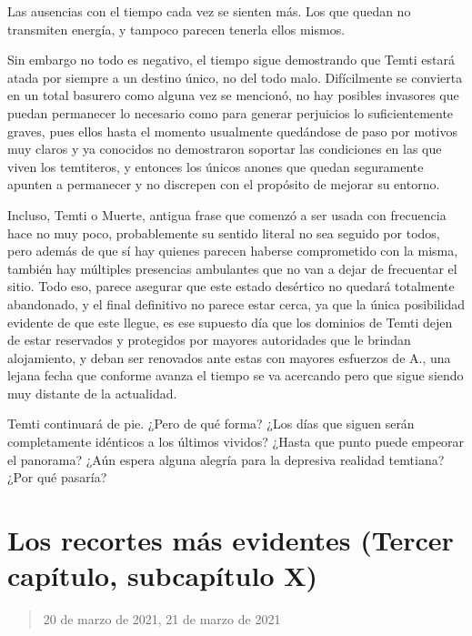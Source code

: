 \documentclass[
  spanish,
]{book}
\begin{document}
Las ausencias con el tiempo cada vez se sienten más. Los que quedan no transmiten energía, y tampoco parecen tenerla ellos mismos.

Sin embargo no todo es negativo, el tiempo sigue demostrando que Temti estará atada por siempre a un destino único, no del todo malo. Difícilmente se convierta en un total basurero como alguna vez se mencionó, no hay posibles invasores que puedan permanecer lo necesario como para generar perjuicios lo suficientemente graves, pues ellos hasta el momento usualmente quedándose de paso por motivos muy claros y ya conocidos no demostraron soportar las condiciones en las que viven los temtiteros, y entonces los únicos anones que quedan seguramente apunten a permanecer y no discrepen con el propósito de mejorar su entorno.

Incluso, Temti o Muerte, antigua frase que comenzó a ser usada con frecuencia hace no muy poco, probablemente su sentido literal no sea seguido por todos, pero además de que sí hay quienes parecen haberse comprometido con la misma, también hay múltiples presencias ambulantes que no van a dejar de frecuentar el sitio. Todo eso, parece asegurar que este estado desértico no quedará totalmente abandonado, y el final definitivo no parece estar cerca, ya que la única posibilidad evidente de que este llegue, es ese supuesto día que los dominios de Temti dejen de estar reservados y protegidos por mayores autoridades que le brindan alojamiento, y deban ser renovados ante estas con mayores esfuerzos de A., una lejana fecha que conforme avanza el tiempo se va acercando pero que sigue siendo muy distante de la actualidad.

Temti continuará de pie. ¿Pero de qué forma? ¿Los días que siguen serán completamente idénticos a los últimos vividos? ¿Hasta que punto puede empeorar el panorama? ¿Aún espera alguna alegría para la depresiva realidad temtiana? ¿Por qué pasaría?

\hypertarget{los-recortes-muxe1s-evidentes-tercer-capuxedtulo-subcapuxedtulo-x}{%
\section{Los recortes más evidentes (Tercer capítulo, subcapítulo X)}\label{los-recortes-muxe1s-evidentes-tercer-capuxedtulo-subcapuxedtulo-x}}

\begin{quote}
20 de marzo de 2021, 21 de marzo de 2021
\end{quote}
\end{document}
